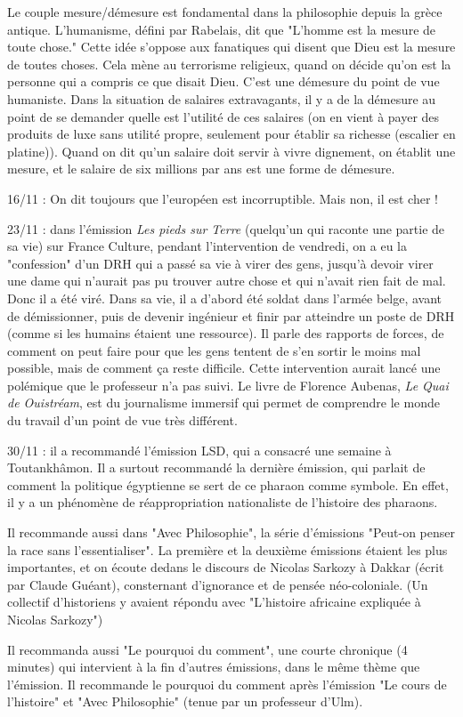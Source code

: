 \documentclass[a4paper,12pt]{book}
\begin{document}
\par Le couple mesure/démesure est fondamental dans la philosophie depuis la grèce antique. L'humanisme, défini par Rabelais, dit que "L'homme est la mesure de toute chose." Cette idée s'oppose aux fanatiques qui disent que Dieu est la mesure de toutes choses. Cela mène au terrorisme religieux, quand on décide qu'on est la personne qui a compris ce que disait Dieu. C'est une démesure du point de vue humaniste. Dans la situation de salaires extravagants, il y a de la démesure au point de se demander quelle est l'utilité de ces salaires (on en vient à payer des produits de luxe sans utilité propre, seulement pour établir sa richesse (escalier en platine)). Quand on dit qu'un salaire doit servir à vivre dignement, on établit une mesure, et le salaire de six millions par ans est une forme de démesure.
\par 16/11 : On dit toujours que l'européen est incorruptible. Mais non, il est cher !
\par 23/11 : dans l'émission \textit{Les pieds sur Terre} (quelqu'un qui raconte une partie de sa vie) sur France Culture, pendant l'intervention de vendredi, on a eu la "confession" d'un DRH qui a passé sa vie à virer des gens, jusqu'à devoir virer une dame qui n'aurait pas pu trouver autre chose et qui n'avait rien fait de mal. Donc il a été viré. Dans sa vie, il a d'abord été soldat dans l'armée belge, avant de démissionner, puis de devenir ingénieur et finir par atteindre un poste de DRH (comme si les humains étaient une ressource). Il parle des rapports de forces, de comment on peut faire pour que les gens tentent de s'en sortir le moins mal possible, mais de comment ça reste difficile. Cette intervention aurait lancé une polémique que le professeur n'a pas suivi. Le livre de Florence Aubenas, \textit{Le Quai de Ouistréam}, est du journalisme immersif qui permet de comprendre le monde du travail d'un point de vue très différent.
\par 30/11 : il a recommandé l'émission LSD, qui a consacré une semaine à Toutankhâmon. Il a surtout recommandé la dernière émission, qui parlait de comment la politique égyptienne se sert de ce pharaon comme symbole. En effet, il y a un phénomène de réappropriation nationaliste de l'histoire des pharaons.
\par Il recommande aussi dans "Avec Philosophie", la série d'émissions "Peut-on penser la race sans l'essentialiser". La première et la deuxième émissions étaient les plus importantes, et on écoute dedans le discours de Nicolas Sarkozy à Dakkar (écrit par Claude Guéant), consternant d'ignorance et de pensée néo-coloniale. (Un collectif d'historiens y avaient répondu avec "L'histoire africaine expliquée à Nicolas Sarkozy")
\par Il recommanda aussi "Le pourquoi du comment", une courte chronique (4 minutes) qui intervient à la fin d'autres émissions, dans le même thème que l'émission. Il recommande le pourquoi du comment après l'émission "Le cours de l'histoire" et "Avec Philosophie" (tenue par un professeur d'Ulm).
\end{document}
